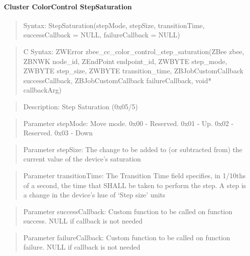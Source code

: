 \paragraph{Cluster ColorControl StepSaturation}
\begin{quote}Syntax: StepSaturation(stepMode, stepSize, transitionTime, successCallback = NULL, failureCallback = NULL)\end{quote}
\begin{quote}C Syntax: ZWError zbee\_cc\_color\_control\_step\_saturation(ZBee zbee, ZBNWK node\_id, ZEndPoint endpoint\_id, ZWBYTE step\_mode, ZWBYTE step\_size, ZWBYTE transition\_time, ZBJobCustomCallback successCallback, ZBJobCustomCallback failureCallback, void* callbackArg)\end{quote}
\begin{quote}Description: Step Saturation (0x05/5)\end{quote}
\begin{quote}Parameter stepMode: Move mode. 0x00 - Reserved. 0x01 - Up. 0x02 - Reserved. 0x03 - Down\end{quote}
\begin{quote}Parameter stepSize: The change to be added to (or subtracted from) the current value of the device’s saturation\end{quote}
\begin{quote}Parameter transitionTime: The Transition Time field specifies, in 1/10ths of a second, the time that SHALL be taken to perform the step. A step is a change in the device’s hue of ‘Step size’ units\end{quote}
\begin{quote}Parameter successCallback: Custom function to be called on function success. NULL if callback is not needed\end{quote}
\begin{quote}Parameter failureCallback: Custom function to be called on function failure. NULL if callback is not needed\end{quote}


